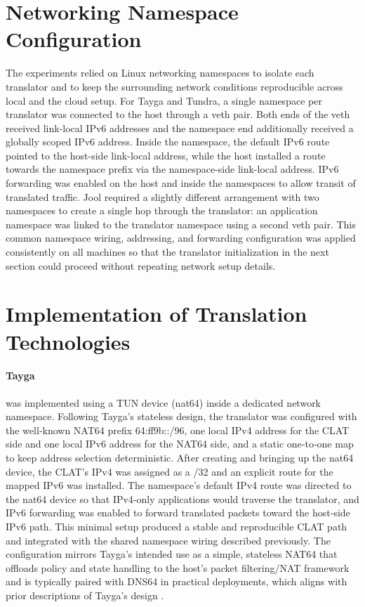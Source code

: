 \section{Networking Namespace Configuration}
The experiments relied on Linux networking namespaces to isolate each translator and to keep the surrounding network conditions reproducible across local and the cloud setup. For Tayga and Tundra, a single namespace per translator was connected to the host through a veth pair\cite{veth4}. Both ends of the veth received link-local IPv6 addresses and the namespace end additionally received a globally scoped IPv6 address. Inside the namespace, the default IPv6 route pointed to the host-side link-local address, while the host installed a route towards the namespace prefix via the namespace-side link-local address. IPv6 forwarding was enabled on the host and inside the namespaces to allow transit of translated traffic. 
Jool required a slightly different arrangement with two namespaces to create a single hop through the translator: an application namespace was linked to the translator namespace using a second veth pair. This common namespace wiring, addressing, and forwarding configuration was applied consistently on all machines so that the translator initialization in the next section could proceed without repeating network setup details.

\section{Implementation of Translation Technologies}
\paragraph{Tayga}
was implemented using a TUN device (nat64) inside a dedicated network namespace. Following Tayga’s stateless design, the translator was configured with the well‑known NAT64 prefix 64:ff9b::/96, one local IPv4 address for the CLAT side and one local IPv6 address for the NAT64 side, and a static one‑to‑one map to keep address selection deterministic. After creating and bringing up the nat64 device, the CLAT’s IPv4 was assigned as a /32 and an explicit route for the mapped IPv6 was installed. The namespace’s default IPv4 route was directed to the nat64 device so that IPv4‑only applications would traverse the translator, and IPv6 forwarding was enabled to forward translated packets toward the host‑side IPv6 path. This minimal setup produced a stable and reproducible CLAT path and integrated with the shared namespace wiring described previously. The configuration mirrors Tayga’s intended use as a simple, stateless NAT64 that offloads policy and state handling to the host’s packet filtering/NAT framework and is typically paired with DNS64 in practical deployments, which aligns with prior descriptions of Tayga’s design \cite{Repas_Farnadi_Lencse_2014,palrd_tayga_readme}.

